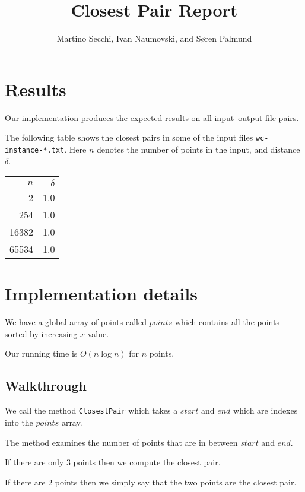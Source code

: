 \documentclass{tufte-handout}
\title{Closest Pair Report}
\author{Martino Secchi, Ivan Naumovski, and Søren Palmund}
\begin{document}
  \maketitle

  \section{Results}

  Our implementation produces the expected results on all input--output file pairs.

  The following table shows the closest pairs in some of the input files {\tt wc-instance-*.txt}.
  Here $n$ denotes the number of points in the input,
  and distance $\delta$.

  \bigskip\noindent
  \begin{tabular}{rr}\toprule
    $n$ & $\delta$ \\\midrule
    2 & 1.0 \\
    254 & 1.0 \\
    16382 & 1.0 \\
    65534 & 1.0 \\\bottomrule
  \end{tabular}


  \section{Implementation details}
  We have a global array of points called $points$ which contains all the points sorted by increasing $x$-value.

    Our running time is $O(n\log n)$ for $n$ points.
    
  \subsection{Walkthrough}
  
  We call the method \verb+ClosestPair+ which takes a $start$ and $end$ which are indexes into the $points$ array.
  
  The method examines the number of points that are in between $start$ and $end$.\newline

  If there are only 3 points then we compute the closest pair.\newline
  
  If there are 2 points then we simply say that the two points are the closest pair.\newline
  
\end{document}
